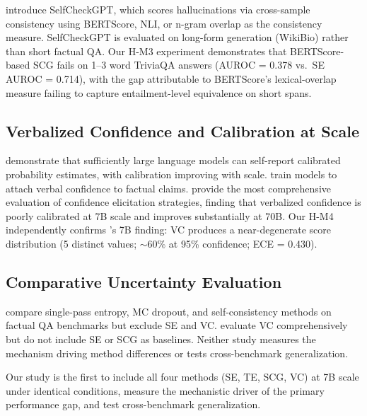 \citet{Manakul2023} introduce SelfCheckGPT, which scores hallucinations via cross-sample consistency using BERTScore, NLI, or n-gram overlap as the consistency measure.
SelfCheckGPT is evaluated on long-form generation (WikiBio) rather than short factual QA.
Our H-M3 experiment demonstrates that BERTScore-based SCG fails on 1--3 word TriviaQA answers (AUROC = 0.378 vs.\ SE AUROC = 0.714), with the gap attributable to BERTScore's lexical-overlap measure failing to capture entailment-level equivalence on short spans.

\subsection{Verbalized Confidence and Calibration at Scale}

\citet{Kadavath2022} demonstrate that sufficiently large language models can self-report calibrated probability estimates, with calibration improving with scale.
\citet{Lin2022b} train models to attach verbal confidence to factual claims.
\citet{Xiong2023} provide the most comprehensive evaluation of confidence elicitation strategies, finding that verbalized confidence is poorly calibrated at 7B scale and improves substantially at 70B.
Our H-M4 independently confirms \citet{Xiong2023}'s 7B finding: VC produces a near-degenerate score distribution (5 distinct values; ${\sim}60\%$ at 95\% confidence; ECE = 0.430).

\subsection{Comparative Uncertainty Evaluation}

\citet{Huang2023} compare single-pass entropy, MC dropout, and self-consistency methods on factual QA benchmarks but exclude SE and VC.
\citet{Xiong2023} evaluate VC comprehensively but do not include SE or SCG as baselines.
Neither study measures the mechanism driving method differences or tests cross-benchmark generalization.

Our study is the first to include all four methods (SE, TE, SCG, VC) at 7B scale under identical conditions, measure the mechanistic driver of the primary performance gap, and test cross-benchmark generalization.

